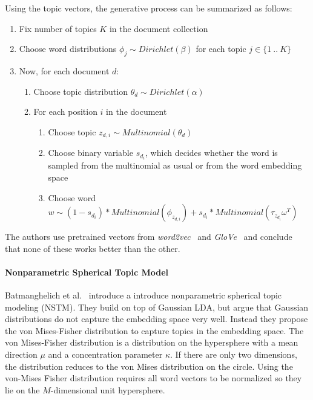 \documentclass[
        a4paper,
        titlepage,
        twoside,
        parskip
        ]{scrbook}
\theoremstyle{break}
\begin{document}
Using the topic vectors, the generative process can be summarized as follows:
\begin{enumerate}
    \item Fix number of topics $K$ in the document collection
    \item Choose word distributions $\phi_j \sim Dirichlet(\beta)$ for each topic $j \in \{1~..~K\}$
    \item Now, for each document $d$:
    \begin{enumerate}
        \item Choose topic distribution $\theta_d \sim Dirichlet(\alpha)$
        \item For each position $i$ in the document
        \begin{enumerate}
            \item Choose topic $z_{d,i} \sim Multinomial(\theta_d)$
            \item Choose binary variable $s_{d_i}$, which decides whether the word is sampled from the multinomial as usual or from the word embedding space
            \item Choose word $w \sim (1 - s_{d_i}) * Multinomial(\phi_{z_{d,i}}) + s_{d_i} * Multinomial(\tau_{z_{d_{i}}} \omega^T)$
        \end{enumerate}
    \end{enumerate}
\end{enumerate}
The authors use pretrained vectors from \emph{word2vec}~\cite{Mikolov2013a} and \emph{GloVe}~\cite{Pennington2014} and conclude that none of these works better than the other.

\paragraph{Nonparametric Spherical Topic Model}
Batmanghelich et al.~\cite{Batmanghelich2016} introduce a  introduce nonparametric spherical topic modeling (NSTM).
They build on top of Gaussian LDA, but argue that Gaussian distributions do not capture the embedding space very well.
Instead they propose the von Mises-Fisher distribution to capture topics in the embedding space.
The von Mises-Fisher distribution is a distribution on the hypersphere with a mean direction $\mu$ and a concentration parameter $\kappa$.
If there are only two dimensions, the distribution reduces to the von Mises distribution on the circle.
Using the von-Mises Fisher distribution requires all word vectors to be normalized so they lie on the $M$-dimensional unit hypersphere.
\end{document}
